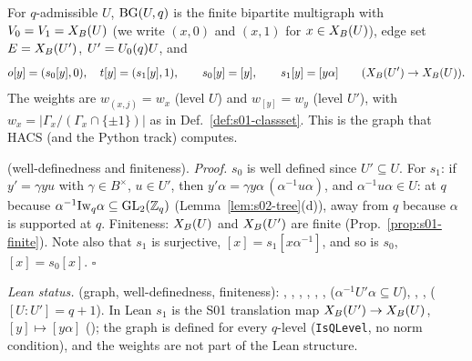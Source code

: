 \begin{definition}\label{def:s02-BG}
For $q$-admissible $U$, $\mathrm{BG}(U,q)$ is the finite bipartite multigraph with $V_0=V_1=X_B(U)$ (we write $(x,0)$ and $(x,1)$ for
$x\in X_B(U)$), edge set $E=X_B(U')$, $U'=U_0(q)U$, and
\[o[y]=(s_0[y],0),\quad t[y]=(s_1[y],1),\qquad s_0[y]=[y],\qquad s_1[y]=[y\alpha]\qquad(X_B(U')\to X_B(U)).\]
The weights are $w_{(x,j)}=w_x$ (level $U$) and $w_{[y]}=w_y$ (level $U'$), with $w_x=|\Gamma_x/(\Gamma_x\cap\{\pm1\})|$ as in
Def.~\ref{def:s01-classset}. This is the graph that HACS (and the Python track) computes.
\end{definition}
\noindent\stproved{} (well-definedness and finiteness). \emph{Proof.} $s_0$ is well defined since $U'\subseteq U$. For $s_1$: if
$y'=\gamma yu$ with $\gamma\in B^\times$, $u\in U'$, then $y'\alpha=\gamma y\alpha\,(\alpha^{-1}u\alpha)$, and $\alpha^{-1}u\alpha\in U$:
at $q$ because $\alpha^{-1}\mathrm{Iw}_q\alpha\subseteq\mathrm{GL}_2(\mathbb{Z}_q)$ (Lemma~\ref{lem:s02-tree}(d)), away from $q$ because $\alpha$ is
supported at $q$. Finiteness: $X_B(U)$ and $X_B(U')$ are finite (Prop.~\ref{prop:s01-finite}). Note also that $s_1$ is surjective,
$[x]=s_1[x\alpha^{-1}]$, and so is $s_0$, $[x]=s_0[x]$. \hfill$\square$

\begin{sloppypar}\noindent\emph{Lean status.} \stformal{} (graph, well-definedness, finiteness):
, , , ,
, , 
($\alpha^{-1}U'\alpha\subseteq U$), , ,
 ($[U:U']=q+1$). In Lean $s_1$ is the S01 translation map
$X_B(U')\to X_B(U)$, $[y]\mapsto[y\alpha]$ (); the graph is defined for every $q$-level
(\texttt{IsQLevel}, no norm condition), and the weights are not part of the Lean structure.\end{sloppypar}

